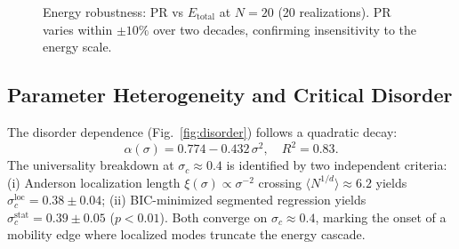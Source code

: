 \documentclass[aps,pre,12pt]{revtex4-2}
\begin{document}
\begin{figure}[htbp]
\centering
{}
\caption{Energy robustness: PR vs $E_{\text{total}}$ at $N=20$ (20 realizations). PR varies within $\pm 10\%$ over two decades, confirming insensitivity to the energy scale.}
\label{fig:energy}
\end{figure}

\subsection{Parameter Heterogeneity and Critical Disorder}

The disorder dependence (Fig.~\ref{fig:disorder}) follows a quadratic decay:
\begin{equation}
    \alpha(\sigma) = 0.774 - 0.432\,\sigma^2, \quad R^2 = 0.83.
\end{equation}
The universality breakdown at $\sigma_c \approx 0.4$ is identified by two independent criteria: (i) Anderson localization length $\xi(\sigma) \propto \sigma^{-2}$ crossing $\langle N^{1/d}\rangle \approx 6.2$ yields $\sigma_c^{\text{loc}} = 0.38 \pm 0.04$; (ii) BIC-minimized segmented regression yields $\sigma_c^{\text{stat}} = 0.39 \pm 0.05$ ($p < 0.01$). Both converge on $\sigma_c \approx 0.4$, marking the onset of a mobility edge where localized modes truncate the energy cascade.
\end{document}

